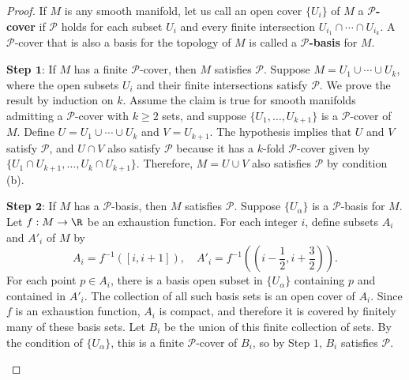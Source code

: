 \begin{proof}
If $M$ is any smooth manifold, let us call an open cover $\{U_i\}$ of $M$ a \textbf{$\mathcal{P}$-cover} if $\mathcal{P}$ holds for each subset $U_i$ and every finite 
intersection $U_{i_1}\cap\cdots\cap U_{i_k}$. A $\mathcal{P}$-cover that is also a basis for the topology of $M$ is called a \textbf{$\mathcal{P}$-basis} for $M$.\par
\textbf{Step $\bm{1}$}: If $M$ has a finite $\mathcal{P}$-cover, then $M$ satisfies $\mathcal{P}$. Suppose $M=U_1\cup\cdots\cup U_k$, where the open subsets $U_i$ and 
their finite intersections satisfy $\mathcal{P}$. We prove the result by induction on $k$. Assume the claim is true for smooth manifolds admitting a $\mathcal{P}$-cover 
with $k\geq 2$ sets, and suppose $\{U_1,\dots,U_{k+1}\}$ is a $\mathcal{P}$-cover of $M$. Define $U=U_1\cup\cdots\cup U_k$ and $V=U_{k+1}$. The hypothesis implies that 
$U$ and $V$ satisfy $\mathcal{P}$, and $U\cap V$ also satisfy $\mathcal{P}$ because it has a $k$-fold $\mathcal{P}$-cover given by $\{U_1\cap U_{k+1},\dots,U_k\cap U_{k+1}\}$. 
Therefore, $M=U\cup V$ also satisfies $\mathcal{P}$ by condition (b).\par
\textbf{Step $\bm{2}$}: If $M$ has a $\mathcal{P}$-basis, then $M$ satisfies $\mathcal{P}$. Suppose $\{U_\alpha\}$ is a $\mathcal{P}$-basis for $M$. Let $f:M\to\R$ be 
an exhaustion function. For each integer $i$, define subsets $A_i$ and $A'_i$ of $M$ by
\[A_i=f^{-1}([i,i+1]),\quad A'_i=f^{-1}((i-\frac{1}{2},i+\frac{3}{2})).\]
For each point $p\in A_i$, there is a basis open subset in $\{U_\alpha\}$ containing $p$ and contained in $A'_i$. The collection of all such basis sets is an open cover 
of $A_i$. Since $f$ is an exhaustion function, $A_i$ is compact, and therefore it is covered by finitely many of these basis sets. Let $B_i$ be the union of this finite 
collection of sets. By the condition of $\{U_\alpha\}$, this is a finite $\mathcal{P}$-cover of $B_i$, so by Step $1$, $B_i$ satisfies $\mathcal{P}$.
\begin{figure}[htbp]
\centering

\end{figure}
\end{proof}

